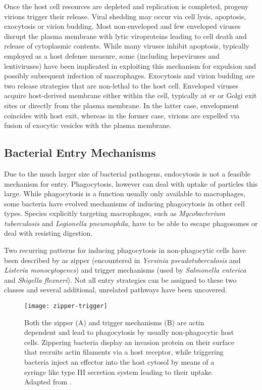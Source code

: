 Once the host cell resources are depleted and replication is completed, progeny virions trigger their release. Viral shedding may occur via cell lysis, apoptosis, exocytosis or virion budding. Most non-enveloped and few enveloped viruses disrupt the plasma membrane with lytic viroproteins leading to cell death and release of cytoplasmic contents. While many viruses inhibit  apoptosis, typically employed as a host defense measure, some (including hepeviruses and lentiviruses) have been implicated in exploiting this mechanism for expulsion and possibly subsequent infection of macrophages. Exocytosis and virion budding are two release strategies that are non-lethal to the host cell. Enveloped viruses acquire host-derived membrane either within the cell, typically at \gls{er} or Golgi exit sites or directly from the plasma membrane. In the latter case, envelopment coincides with host exit, whereas in the former case, virions are expelled via fusion of exocytic vesicles with the plasma membrane.

\subsection{Bacterial Entry Mechanisms}

Due to the much larger size of bacterial pathogens, endocytosis is not a feasible mechanism for entry. Phagocytosis, however can deal with uptake of particles this large. While phagocytosis is a function usually only available to macrophages, some bacteria have evolved mechanisms of inducing phagocytosis in other cell types. Species explicitly targeting macrophages, such as \textit{Mycobacterium tuberculosis} and \textit{Legionella pneumophila}, have to be able to escape phagosomes or deal with resisting digestion.

Two recurring patterns for inducing phagocytosis in non-phagocytic cells have been described by \cite{Cossart2004} as zipper (encountered in \textit{Yersinia pseudotuberculosis} and \textit{Listeria monocytogenes}) and trigger mechanisms (used by \textit{Salmonella enterica} and \textit{Shigella flexneri}). Not all entry strategies can be assigned to these two classes and several additional, unrelated pathways have been uncovered.

\begin{figure}
  \centering
  \texttt{[image: zipper-trigger]}
  \caption[Zipper and trigger mechanisms for bacterial host-cell entry]{Both the zipper (A) and trigger mechanisms (B) are actin dependent and lead to phagocytosis by usually non-phagocytic host cells. Zippering bacteria display an invasion protein on their surface that recruits actin filaments via a host receptor, while triggering bacteria inject an effector into the host cytosol by means of a syringe like type III secretion system leading to their uptake. Adapted from \cite{Haglund2011}.}
  \label{fig:zipper-trigger}
\end{figure}

